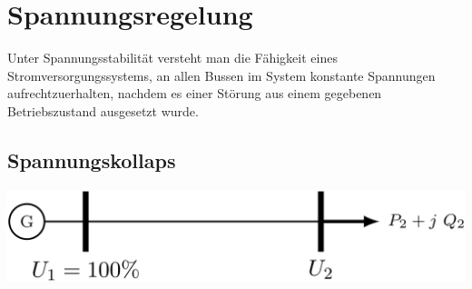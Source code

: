 \section{Spannungsregelung}
Unter Spannungsstabilität versteht man die Fähigkeit eines Stromversorgungssystems, an allen Bussen im System konstante Spannungen aufrechtzuerhalten, nachdem es einer Störung aus einem gegebenen Betriebszustand ausgesetzt wurde.


\subsection{Spannungskollaps}

\includegraphics[width=0.68\columnwidth, align=c]{images/Spannungsregelung_2.jpg}

\vspace{0.15cm}


\subsection{}


\subsection{}


\subsection{}


\subsection{}


\subsection{}


\subsection{}


\subsection{}


\subsection{}


\subsection{}


\subsection{}
